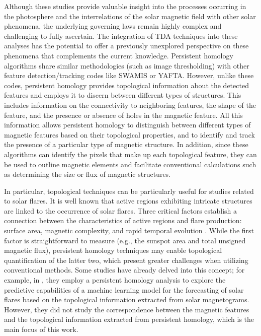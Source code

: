 Although these studies provide valuable insight into the processes occurring in the photosphere and the interrelations of the solar magnetic field with other solar phenomena, the underlying governing laws remain highly complex and challenging to fully ascertain. The integration of TDA techniques into these analyses has the potential to offer a previously unexplored perspective on these phenomena that complements the current knowledge. Persistent homology algorithms share similar methodologies (such as image thresholding) with other feature detection/tracking codes like SWAMIS or YAFTA. However, unlike these codes, persistent homology provides topological information about the detected features and employs it to discern between different types of structures. This includes information on the connectivity to neighboring features, the shape of the feature, and the presence or absence of holes in the magnetic feature. All this information allows persistent homology to distinguish between different types of magnetic features based on their topological properties, and to identify and track the presence of a particular type of magnetic structure. In addition, since these algorithms can identify the pixels that make up each topological feature, they can be used to outline magnetic elements and facilitate conventional calculations such as determining the size or flux of magnetic structures.

In particular, topological techniques can be particularly useful for studies related to solar flares. It is well known that active regions exhibiting intricate structures are linked to the occurrence of solar flares. Three critical factors establish a connection between the characteristics of active regions and flare production: surface area, magnetic complexity, and rapid temporal evolution \citep{flare_LR}. While the first factor is straightforward to measure (e.g., the sunspot area and total unsigned magnetic flux), persistent homology techniques may enable topological quantification of the latter two, which present greater challenges when utilizing conventional methods. Some studies have already delved into this concept; for example, in \cite{ph_solar_2}, they employ a persistent homology analysis to explore the predictive capabilities of a machine learning model for the forecasting of solar flares based on the topological information extracted from solar magnetograms. However, they did not study the correspondence between the magnetic features and the topological information extracted from persistent homology, which is the main focus of this work.



